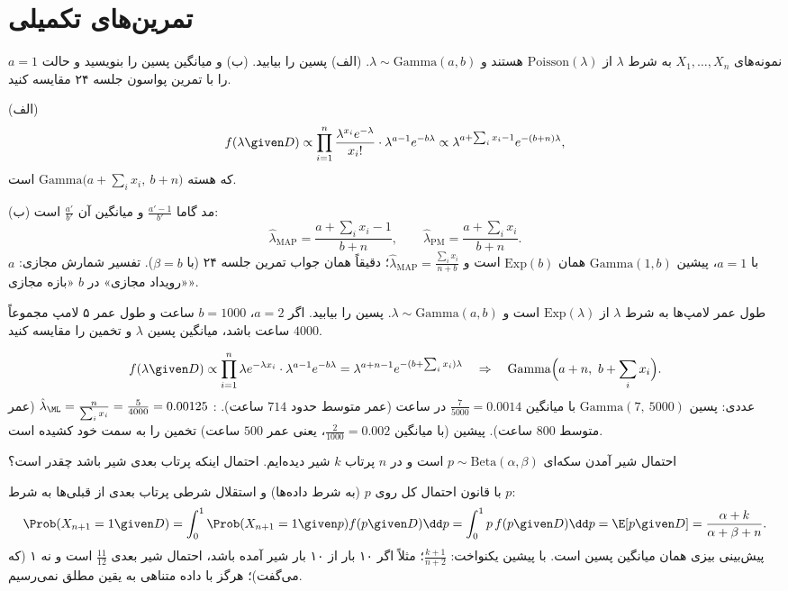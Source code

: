 \section{تمرین‌های تکمیلی}

\begin{exercise}
نمونه‌های $X_1,\ldots,X_n$ به شرط $\lambda$  از $\mathrm{Poisson}(\lambda)$ هستند و $\lambda\sim\mathrm{Gamma}(a,b)$. (الف) پسین را بیابید. (ب)  و میانگین پسین را بنویسید و حالت $a=1$ را با تمرین پواسون جلسه ۲۴ مقایسه کنید.
\end{exercise}
\begin{solution}
(الف)
\[
f(\lambda\given D)\propto\prod_{i=1}^n\frac{\lambda^{x_i}e^{-\lambda}}{x_i!}\cdot\lambda^{a-1}e^{-b\lambda}\propto\lambda^{a+\sum_ix_i-1}e^{-(b+n)\lambda},
\]
که هسته $\mathrm{Gamma}\big(a+\sum_ix_i,\ b+n\big)$ است.

(ب) مد گاما $\frac{a'-1}{b'}$ و میانگین آن $\frac{a'}{b'}$ است:
\[
\hat\lambda_{\mathrm{MAP}}=\frac{a+\sum_ix_i-1}{b+n},\qquad\hat\lambda_{\mathrm{PM}}=\frac{a+\sum_ix_i}{b+n}.
\]
با $a=1$، پیشین $\mathrm{Gamma}(1,b)$ همان $\mathrm{Exp}(b)$ است و $\hat\lambda_{\mathrm{MAP}}=\frac{\sum_ix_i}{n+b}$؛ دقیقاً همان جواب تمرین جلسه ۲۴ (با $\beta=b$). تفسیر شمارش مجازی: $a$ «رویداد مجازی» در $b$ «بازه مجازی».
\end{solution}

\begin{exercise}
طول عمر لامپ‌ها به شرط $\lambda$  از $\mathrm{Exp}(\lambda)$ است و $\lambda\sim\mathrm{Gamma}(a,b)$. پسین را بیابید. اگر $a=2$، $b=1000$ ساعت و طول عمر ۵ لامپ مجموعاً $4000$ ساعت باشد، میانگین پسین $\lambda$ و تخمین  را مقایسه کنید.
\end{exercise}
\begin{solution}
\[
f(\lambda\given D)\propto\prod_{i=1}^n\lambda e^{-\lambda x_i}\cdot\lambda^{a-1}e^{-b\lambda}=\lambda^{a+n-1}e^{-(b+\sum_ix_i)\lambda}
\quad\Rightarrow\quad\mathrm{Gamma}\Big(a+n,\ b+\sum_ix_i\Big).
\]
عددی: پسین $\mathrm{Gamma}(7,\ 5000)$ با میانگین $\frac{7}{5000}=0.0014$ در ساعت (عمر متوسط حدود $714$ ساعت). : $\hat\lambda_\ML=\frac{n}{\sum_ix_i}=\frac{5}{4000}=0.00125$ (عمر متوسط $800$ ساعت). پیشین (با میانگین $\frac{2}{1000}=0.002$، یعنی عمر $500$ ساعت) تخمین را به سمت خود کشیده است.
\end{solution}

\begin{exercise}
احتمال شیر آمدن سکه‌ای $p\sim\mathrm{Beta}(\alpha,\beta)$ است و در $n$ پرتاب $k$ شیر دیده‌ایم. احتمال اینکه پرتاب بعدی شیر باشد چقدر است؟
\end{exercise}
\begin{solution}
با قانون احتمال کل روی $p$ (به شرط داده‌ها) و استقلال شرطی پرتاب بعدی از قبلی‌ها به شرط $p$:
\[
\Prob(X_{n+1}=1\given D)=\int_0^1\Prob(X_{n+1}=1\given p)f(p\given D)\dd p=\int_0^1p\,f(p\given D)\dd p=\E[p\given D]=\frac{\alpha+k}{\alpha+\beta+n}.
\]
پیش‌بینی بیزی همان میانگین پسین است. با پیشین یکنواخت: $\frac{k+1}{n+2}$؛ مثلاً اگر ۱۰ بار از ۱۰ بار شیر آمده باشد، احتمال شیر بعدی $\frac{11}{12}$ است و نه ۱ (که  می‌گفت)؛ هرگز با داده متناهی به یقین مطلق نمی‌رسیم.
\end{solution}

